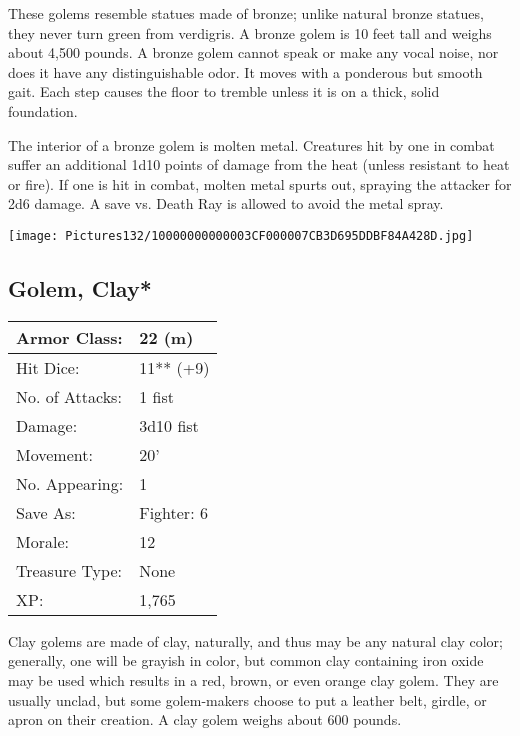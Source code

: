 \documentclass[a4paper,twoside,openany,10pt]{book}
\begin{document}
\begin{multicols}{2}
These golems resemble statues made of bronze; unlike natural bronze statues, they never turn green from verdigris. A bronze golem is 10 feet tall and weighs about 4,500 pounds. A bronze golem cannot speak or make any vocal noise, nor does it have any distinguishable odor. It moves with a ponderous but smooth gait. Each step causes the floor to tremble unless it is on a thick, solid foundation.

The interior of a bronze golem is molten metal. Creatures hit by one in combat suffer an additional 1d10 points of damage from the heat (unless resistant to heat or fire). If one is hit in combat, molten metal spurts out, spraying the attacker for 2d6 damage. A save vs. Death Ray is allowed to avoid the metal spray.

\begin{center}
	\texttt{[image: Pictures132/10000000000003CF000007CB3D695DDBF84A428D.jpg]}
\end{center}

\subsection*{Golem, Clay*}\label{golem-clay}

\begin{tabularx}{0.48\textwidth}{@{}lX@{}}
Armor Class: & 22 (m) \\\hline
Hit Dice: & 11** (+9) \\\hline
No. of Attacks: & 1 fist \\\hline
Damage: & 3d10 fist \\\hline
Movement: & 20' \\\hline
No. Appearing: & 1 \\\hline
Save As: & Fighter: 6 \\\hline
Morale: & 12 \\\hline
Treasure Type: & None \\\hline
XP: & 1,765 \\\hline
\end{tabularx}\medskip

Clay golems are made of clay, naturally, and thus may be any natural clay color; generally, one will be grayish in color, but common clay containing iron oxide may be used which results in a red, brown, or even orange clay golem. They are usually unclad, but some golem-makers choose to put a leather belt, girdle, or apron on their creation. A clay golem weighs about 600 pounds.


\end{multicols}
\end{document}
